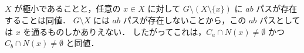 \subsection{}
$X$ が極小であることと，任意の $x\in X$ に対して $G\setminus (X\setminus \{x\})$ に $ab$ パスが存在することは同値．
$G\setminus X$ には $ab$ パスが存在しないことから，この $ab$ パスとしては $x$ を通るものしかありえない．
したがってこれは，$C_a\cap N(x) \neq \emptyset$ かつ $C_b\cap N(x) \neq \emptyset$ と同値．
